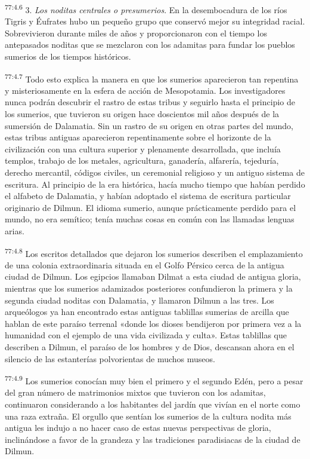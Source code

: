 \par
\textsuperscript{77:4.6} 3. \textit{Los noditas centrales o presumerios}. En la desembocadura de los ríos Tigris y Éufrates hubo un pequeño grupo que conservó mejor su integridad racial. Sobrevivieron durante miles de años y proporcionaron con el tiempo los antepasados noditas que se mezclaron con los adamitas para fundar los pueblos sumerios de los tiempos históricos.

\par
\textsuperscript{77:4.7} Todo esto explica la manera en que los sumerios aparecieron tan repentina y misteriosamente en la esfera de acción de Mesopotamia. Los investigadores nunca podrán descubrir el rastro de estas tribus y seguirlo hasta el principio de los sumerios, que tuvieron su origen hace doscientos mil años después de la sumersión de Dalamatia. Sin un rastro de su origen en otras partes del mundo, estas tribus antiguas aparecieron repentinamente sobre el horizonte de la civilización con una cultura superior y plenamente desarrollada, que incluía templos, trabajo de los metales, agricultura, ganadería, alfarería, tejeduría, derecho mercantil, códigos civiles, un ceremonial religioso y un antiguo sistema de escritura. Al principio de la era histórica, hacía mucho tiempo que habían perdido el alfabeto de Dalamatia, y habían adoptado el sistema de escritura particular originario de Dilmun. El idioma sumerio, aunque prácticamente perdido para el mundo, no era semítico; tenía muchas cosas en común con las llamadas lenguas arias.

\par
\textsuperscript{77:4.8} Los escritos detallados que dejaron los sumerios describen el emplazamiento de una colonia extraordinaria situada en el Golfo Pérsico cerca de la antigua ciudad de Dilmun. Los egipcios llamaban Dilmat a esta ciudad de antigua gloria, mientras que los sumerios adamizados posteriores confundieron la primera y la segunda ciudad noditas con Dalamatia, y llamaron Dilmun a las tres. Los arqueólogos ya han encontrado estas antiguas tablillas sumerias de arcilla que hablan de este paraíso terrenal «donde los dioses bendijeron por primera vez a la humanidad con el ejemplo de una vida civilizada y culta». Estas tablillas que describen a Dilmun, el paraíso de los hombres y de Dios, descansan ahora en el silencio de las estanterías polvorientas de muchos museos.

\par
\textsuperscript{77:4.9} Los sumerios conocían muy bien el primero y el segundo Edén, pero a pesar del gran número de matrimonios mixtos que tuvieron con los adamitas, continuaron considerando a los habitantes del jardín que vivían en el norte como una raza extraña. El orgullo que sentían los sumerios de la cultura nodita más antigua les indujo a no hacer caso de estas nuevas perspectivas de gloria, inclinándose a favor de la grandeza y las tradiciones paradisiacas de la ciudad de Dilmun.

